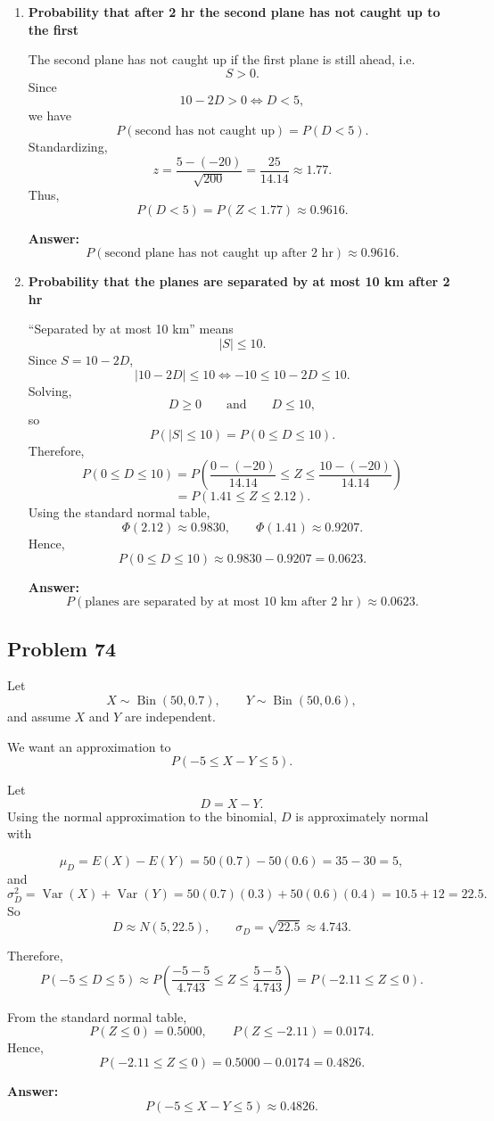 \documentclass[11pt]{article}
\begin{document}
\begin{enumerate}
    \item[(a)] \textbf{Probability that after 2 hr the second plane has not caught up to the first}

    The second plane has not caught up if the first plane is still ahead, i.e.
    \[
    S>0.
    \]
    Since
    \[
    10-2D>0 \iff D<5,
    \]
    we have
    \[
    P(\text{second has not caught up})=P(D<5).
    \]
    Standardizing,
    \[
    z=\frac{5-(-20)}{\sqrt{200}}=\frac{25}{14.14}\approx 1.77.
    \]
    Thus,
    \[
    P(D<5)=P(Z<1.77)\approx 0.9616.
    \]

    \textbf{Answer:}
    \[
    P(\text{second plane has not caught up after 2 hr})\approx 0.9616.
    \]

    \item[(b)] \textbf{Probability that the planes are separated by at most 10 km after 2 hr}

    “Separated by at most 10 km” means
    \[
    |S|\le 10.
    \]
    Since $S=10-2D$,
    \[
    |10-2D|\le 10
    \iff -10\le 10-2D\le 10.
    \]
    Solving,
    \[
    D\ge 0 \qquad \text{and} \qquad D\le 10,
    \]
    so
    \[
    P(|S|\le 10)=P(0\le D\le 10).
    \]
    Therefore,
    \[
    P(0\le D\le 10)
    =P\!\left(\frac{0-(-20)}{14.14}\le Z\le \frac{10-(-20)}{14.14}\right)
    \]
    \[
    =P(1.41\le Z\le 2.12).
    \]
    Using the standard normal table,
    \[
    \Phi(2.12)\approx 0.9830,\qquad \Phi(1.41)\approx 0.9207.
    \]
    Hence,
    \[
    P(0\le D\le 10)\approx 0.9830-0.9207=0.0623.
    \]

    \textbf{Answer:}
    \[
    P(\text{planes are separated by at most 10 km after 2 hr})\approx 0.0623.
    \]
\end{enumerate}

\subsection*{Problem 74}

Let
\[
X\sim \operatorname{Bin}(50,0.7), \qquad Y\sim \operatorname{Bin}(50,0.6),
\]
and assume $X$ and $Y$ are independent.

We want an approximation to
\[
P(-5\le X-Y\le 5).
\]

Let
\[
D=X-Y.
\]
Using the normal approximation to the binomial, $D$ is approximately normal with

\[
\mu_D=E(X)-E(Y)=50(0.7)-50(0.6)=35-30=5,
\]
and
\[
\sigma_D^2=\operatorname{Var}(X)+\operatorname{Var}(Y)
=50(0.7)(0.3)+50(0.6)(0.4)
=10.5+12=22.5.
\]
So
\[
D \approx N(5,22.5),
\qquad
\sigma_D=\sqrt{22.5}\approx 4.743.
\]

Therefore,
\[
P(-5\le D\le 5)
\approx
P\left(\frac{-5-5}{4.743}\le Z\le \frac{5-5}{4.743}\right)
=
P(-2.11\le Z\le 0).
\]

From the standard normal table,
\[
P(Z\le 0)=0.5000,\qquad P(Z\le -2.11)=0.0174.
\]
Hence,
\[
P(-2.11\le Z\le 0)=0.5000-0.0174=0.4826.
\]

\textbf{Answer:}
\[
P(-5\le X-Y\le 5)\approx 0.4826.
\]
\end{document}
